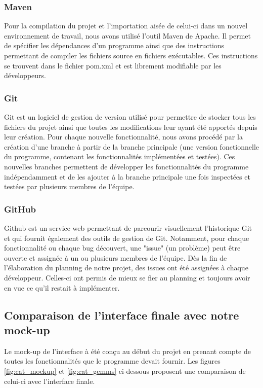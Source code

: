 \subsubsection{Maven}
Pour la compilation du projet et l'importation aisée de celui-ci dans un nouvel environnement de travail, nous avons utilisé l'outil Maven de Apache. Il permet de spécifier les dépendances d'un programme ainsi que des instructions permettant de compiler les fichiers source en fichiers exécutables. Ces instructions se trouvent dans le fichier \og pom.xml \fg{} et est librement modifiable par les développeurs.


\subsubsection{Git}
Git est un logiciel de gestion de version utilisé pour permettre de stocker tous les fichiers du projet ainsi que toutes les modifications leur ayant été apportés depuis leur création. Pour chaque nouvelle fonctionnalité, nous avons procédé par la création d'une branche à partir de la branche principale (une version fonctionnelle du programme, contenant les fonctionnalités implémentées et testées). Ces nouvelles branches permettent de développer les fonctionnalités du programme indépendamment et de les ajouter à la branche principale une fois inspectées et testées par plusieurs membres de l'équipe.

\subsubsection{GitHub}
Github est un service web permettant de parcourir visuellement l'historique Git et qui fournit également des outils de gestion de Git. Notamment, pour chaque fonctionnalité ou chaque bug découvert, une "issue" (un problème) peut être ouverte et assignée à un ou plusieurs membres de l'équipe. Dès la fin de l'élaboration du planning de notre projet, des issues ont été assignées à chaque développeur. Celles-ci ont permis de mieux se fier au planning et toujours avoir en vue ce qu'il restait à implémenter.

\subsection{Comparaison de l'interface finale avec notre mock-up}
Le mock-up de l'interface à été conçu au début du projet en prenant compte de toutes les fonctionnalités que le programme devait fournir. Les figures \ref{fig:cat_mockup} et \ref{fig:cat_gemms} ci-dessous proposent une comparaison de celui-ci avec l'interface finale.

